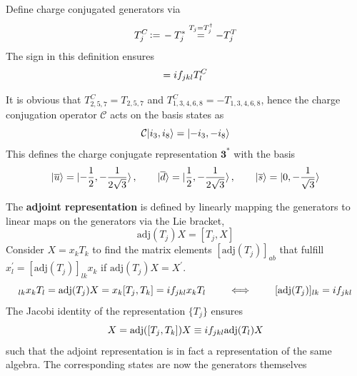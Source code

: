 Define charge conjugated generators via
\begin{equation}
    T_j^C{\,\vcentcolon=\,} -T_j^*\overset{T_j=T_j^\dagger}{=}-T_j^T
\end{equation}
The sign in this definition ensures
\begin{equation}
    [T_j^C,T_k^C]=\imagu f_{jkl}T_l^C
\end{equation}

It is obvious that $T_{2,5,7}^C=T_{2,5,7}$ and $T_{1,3,4,6,8}^C=-T_{1,3,4,6,8}$, hence the charge conjugation operator $\mathcal{C}$ acts on the basis states as
\begin{equation}
    \mathcal{C}{\lvert i_3,i_8\rangle}={\lvert-i_3,-i_8\rangle}
\end{equation}
This defines the charge conjugate representation $\mathbf{3}^*$ with the basis
\begin{equation}
    {\lvert\overline{u}\rangle}={\lvert-\frac{1}{2},-\frac{1}{2\sqrt{3}}\rangle}\,,\qquad{\lvert\overline{d}\rangle}={\lvert\frac{1}{2},-\frac{1}{2\sqrt{3}}\rangle}\,,\qquad{\lvert\overline{s}\rangle}={\lvert0,-\frac{1}{\sqrt{3}}\rangle}
\end{equation}

The \textbf{adjoint representation} is defined by linearly mapping the generators to linear maps on the generators via the Lie bracket,
\begin{equation}
    \text{adj}(T_j)X=[T_j,X]
\end{equation}
Consider $X=x_kT_k$ to find the matrix elements $[\text{adj}(T_j)]_{ab}$ that fulfill $x_l^\prime=[\text{adj}(T_j)]_{lk}x_k$ if $\text{adj}(T_j)X=X^\prime$.
\begin{equation}
    [\text{adj}(T_j)]_{lk}x_kT_l=\text{adj}(T_j)X=x_k[T_j,T_k]=\imagu f_{jkl}x_kT_l\qquad\iff\qquad[\text{adj}(T_j)]_{lk}=\imagu f_{jkl}
\end{equation}
The Jacobi identity of the representation $\{T_j\}$ ensures
\begin{equation}
    [\text{adj}(T_j),\text{adj}(T_k)]X=\text{adj}([T_j,T_k])X\equiv \imagu f_{jkl}\text{adj}(T_l)X
\end{equation}
such that the adjoint representation is in fact a representation of the same algebra. The corresponding states are now the generators themselves  

